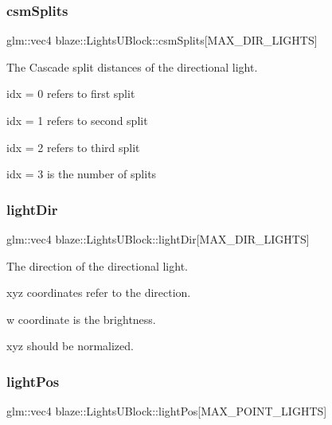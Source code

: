 \subsubsection{\texorpdfstring{csm\+Splits}{csmSplits}}
{\footnotesize\ttfamily glm\+::vec4 blaze\+::\+Lights\+U\+Block\+::csm\+Splits\mbox{[}M\+A\+X\+\_\+\+D\+I\+R\+\_\+\+L\+I\+G\+H\+TS\mbox{]}}



The Cascade split distances of the directional light. 

\begin{DoxyItemize}
\item idx = 0 refers to first split \item idx = 1 refers to second split \item idx = 2 refers to third split \item idx = 3 is the number of splits \end{DoxyItemize}
\mbox{\label{structblaze_1_1LightsUBlock_a37c75420ca15714012d45d66e6519514}} 
\subsubsection{\texorpdfstring{light\+Dir}{lightDir}}
{\footnotesize\ttfamily glm\+::vec4 blaze\+::\+Lights\+U\+Block\+::light\+Dir\mbox{[}M\+A\+X\+\_\+\+D\+I\+R\+\_\+\+L\+I\+G\+H\+TS\mbox{]}}



The direction of the directional light. 

\begin{DoxyItemize}
\item xyz coordinates refer to the direction. \item w coordinate is the brightness. \item xyz should be normalized. \end{DoxyItemize}
\mbox{\label{structblaze_1_1LightsUBlock_af38bd2379a184e9153cf7261a96012fd}} 
\subsubsection{\texorpdfstring{light\+Pos}{lightPos}}
{\footnotesize\ttfamily glm\+::vec4 blaze\+::\+Lights\+U\+Block\+::light\+Pos\mbox{[}M\+A\+X\+\_\+\+P\+O\+I\+N\+T\+\_\+\+L\+I\+G\+H\+TS\mbox{]}}



